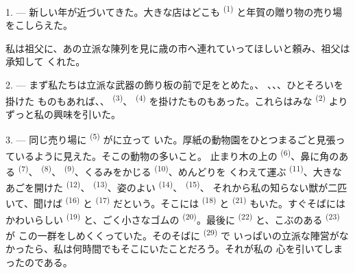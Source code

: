 %
%
%

\VUsaut{4.0mm}
\VUsaut{2.0mm}
\VUsaut{3.4mm}

1. --- 新しい年が近づいてきた。大きな店はどこも
\textsuperscript{(1)} と年賀の贈り物の売り場をこしらえた。

私は祖父に、あの立派な陳列を見に歳の市へ連れていってほしいと頼み、祖父は承知して
くれた。

2. --- まず私たちは立派な武器の飾り板の前で足をとめた。、
、、、ひとそろいを掛けた
ものもあれば、、 \textsuperscript{(3)}、
\textsuperscript{(4)} を掛けたものもあった。これらはみな
\textsuperscript{(2)} よりずっと私の興味を引いた。

\VUsaut{3.0mm}
\VUsaut{2.6mm}

3. --- 同じ売り場に \textsuperscript{(5)} がに立って
いた。厚紙の動物園をひとつまるごと見張っているように見えた。そこの動物の多いこと。
止まり木の上の \textsuperscript{(6)}、鼻に角のある
\textsuperscript{(7)}、 \textsuperscript{(8)}、
\textsuperscript{(9)}、くるみをかじる \textsuperscript{(10)}、めんどりを
くわえて運ぶ \textsuperscript{(11)}、大きなあごを開けた
\textsuperscript{(12)}、 \textsuperscript{(13)}、姿のよい
 \textsuperscript{(14)}、 \textsuperscript{(15)}、
それから私の知らない獣が二匹いて、聞けば \textsuperscript{(16)} と
 \textsuperscript{(17)} だという。そこには
\textsuperscript{(18)} と \textsuperscript{(21)} もいた。すぐそばには
かわいらしい \textsuperscript{(19)} と、ごく小さなゴムの
 \textsuperscript{(20)}。最後に
\textsuperscript{(22)} と、こぶのある \textsuperscript{(23)} が
この一群をしめくくっていた。そのそばに \textsuperscript{(29)} で
いっぱいの立派な陣営がなかったら、私は何時間でもそこにいたことだろう。それが私の
心を引いてしまったのである。

